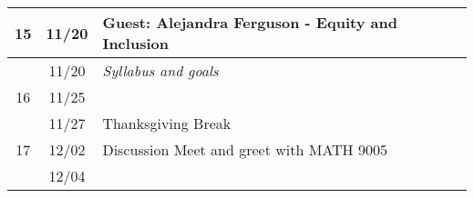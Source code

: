 \begin{longtable}{ |c|c|p{10em}|p{10em}|p{10em}| }
     
  15 & 11/20 & {Guest: Alejandra Ferguson - Equity and Inclusion} %
             & 
             & \\ \hline

     & 11/20 & \textit{Syllabus and goals}
             & 
             & \\ \hline

  16 & 11/25 &  {}   
             & 
             & \\ \hline
             
     & 11/27 &  {Thanksgiving Break}   
             & 
             & \\ \hline

  17 & 12/02 &  {Discussion Meet and greet with MATH 9005}   
             & 
             & \\ \hline
     & 12/04 &  {}   
             & 
             & \\ \hline

             
\end{longtable}

